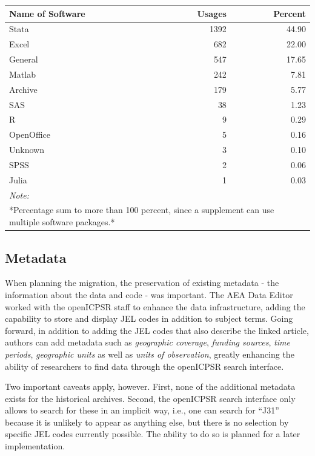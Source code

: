 \documentclass[]{article}
\begin{document}
\begin{table}[H]
\centering
\begin{tabular}{l|r|r}
\hline
Name of Software & Usages & Percent\\
\hline
Stata & 1392 & 44.90\\
\hline
Excel & 682 & 22.00\\
\hline
General & 547 & 17.65\\
\hline
Matlab & 242 & 7.81\\
\hline
Archive & 179 & 5.77\\
\hline
SAS & 38 & 1.23\\
\hline
R & 9 & 0.29\\
\hline
OpenOffice & 5 & 0.16\\
\hline
Unknown & 3 & 0.10\\
\hline
SPSS & 2 & 0.06\\
\hline
Julia & 1 & 0.03\\
\hline
\multicolumn{3}{l}{\textit{Note: }}\\
\multicolumn{3}{l}{*Percentage sum to more than 100 percent, since a supplement can use multiple software packages.*}\\
\end{tabular}
\end{table}

\hypertarget{metadata}{%
\subsection{Metadata}\label{metadata}}

When planning the migration, the preservation of existing metadata - the
information about the data and code - was important. The AEA Data Editor
worked with the openICPSR staff to enhance the data infrastructure,
adding the capability to store and display JEL codes in addition to
subject terms. Going forward, in addition to adding the JEL codes that
also describe the linked article, authors can add metadata such as
\emph{geographic coverage}, \emph{funding sources}, \emph{time periods},
\emph{geographic units} as well as \emph{units of observation}, greatly
enhancing the ability of researchers to find data through the openICPSR
search interface.

Two important caveats apply, however. First, none of the additional
metadata exists for the historical archives. Second, the openICPSR
search interface only allows to search for these in an implicit way,
i.e., one can search for ``J31'' because it is unlikely to appear as
anything else, but there is no selection by specific JEL codes currently
possible. The ability to do so is planned for a later implementation.
\end{document}
